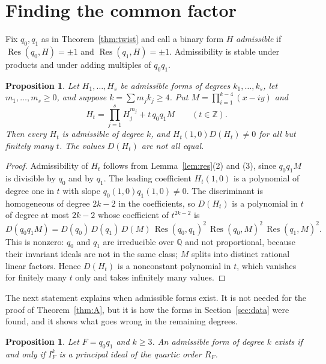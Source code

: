 \documentclass[11pt]{amsart}
\newtheorem{proposition}[theorem]{Proposition}
\theoremstyle{definition}
\newcommand{\ZZ}{\mathbb{Z}}
\newcommand{\QQ}{\mathbb{Q}}
\DeclareMathOperator{\Res}{Res}
\begin{document}
\section{Finding the common factor}\label{sec:exist}

Fix $q_0,q_1$ as in Theorem~\ref{thm:twist} and call a binary form $H$ \emph{admissible} if $\Res(q_0,H)=\pm1$ and $\Res(q_1,H)=\pm1$. Admissibility is stable under products and under adding multiples of $q_0q_1$.

\begin{proposition}\label{prop:family}
Let $H_1,\dots,H_s$ be admissible forms of degrees $k_1,\dots,k_s$, let $m_1,\dots,m_s\ge0$, and suppose $k=\sum m_jk_j\ge4$. Put $M=\prod_{i=1}^{k-4}(x-iy)$ and
\[
H_t=\prod_{j=1}^sH_j^{m_j}+t\,q_0q_1M\qquad(t\in\ZZ).
\]
Then every $H_t$ is admissible of degree $k$, and $H_t(1,0)D(H_t)\neq0$ for all but finitely many $t$. The values $D(H_t)$ are not all equal.
\end{proposition}

\begin{proof}
Admissibility of $H_t$ follows from Lemma~\ref{lem:res}(2) and (3), since $q_0q_1M$ is divisible by $q_0$ and by $q_1$. The leading coefficient $H_t(1,0)$ is a polynomial of degree one in $t$ with slope $q_0(1,0)q_1(1,0)\neq0$. The discriminant is homogeneous of degree $2k-2$ in the coefficients, so $D(H_t)$ is a polynomial in $t$ of degree at most $2k-2$ whose coefficient of $t^{2k-2}$ is
\[
D(q_0q_1M)=D(q_0)\,D(q_1)\,D(M)\,\Res(q_0,q_1)^2\,\Res(q_0,M)^2\,\Res(q_1,M)^2 .
\]
This is nonzero: $q_0$ and $q_1$ are irreducible over $\QQ$ and not proportional, because their invariant ideals are not in the same class; $M$ splits into distinct rational linear factors. Hence $D(H_t)$ is a nonconstant polynomial in $t$, which vanishes for finitely many $t$ only and takes infinitely many values.
\end{proof}

The next statement explains when admissible forms exist. It is not needed for the proof of Theorem~\ref{thm:A}, but it is how the forms in Section~\ref{sec:data} were found, and it shows what goes wrong in the remaining degrees.

\begin{proposition}\label{prop:criterion}
Let $F=q_0q_1$ and $k\ge3$. An admissible form of degree $k$ exists if and only if $I_F^k$ is a principal ideal of the quartic order $R_F$.
\end{proposition}
\end{document}

